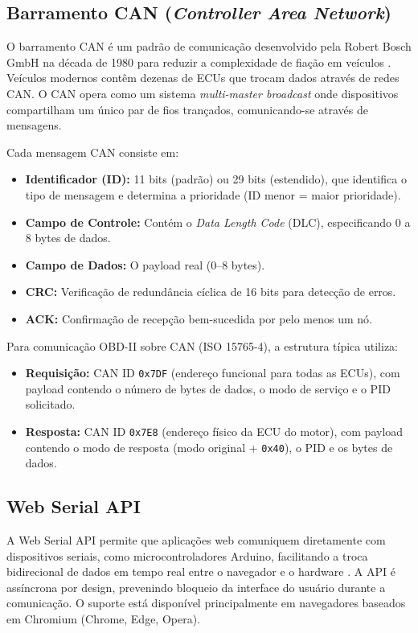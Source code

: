 \subsection{Barramento CAN (\textit{Controller Area Network})}

O barramento CAN é um padrão de comunicação desenvolvido pela Robert Bosch GmbH na década de 1980 para reduzir a complexidade de fiação em veículos \cite{bosch_can}. Veículos modernos contêm dezenas de ECUs que trocam dados através de redes CAN. O CAN opera como um sistema \textit{multi-master broadcast} onde dispositivos compartilham um único par de fios trançados, comunicando-se através de mensagens.

Cada mensagem CAN consiste em:
\begin{itemize}
    \item \textbf{Identificador (ID):} 11 bits (padrão) ou 29 bits (estendido), que identifica o tipo de mensagem e determina a prioridade (ID menor = maior prioridade).
    \item \textbf{Campo de Controle:} Contém o \textit{Data Length Code} (DLC), especificando 0 a 8 bytes de dados.
    \item \textbf{Campo de Dados:} O payload real (0--8 bytes).
    \item \textbf{CRC:} Verificação de redundância cíclica de 16 bits para detecção de erros.
    \item \textbf{ACK:} Confirmação de recepção bem-sucedida por pelo menos um nó.
\end{itemize}

Para comunicação OBD-II sobre CAN (ISO 15765-4), a estrutura típica utiliza:
\begin{itemize}
    \item \textbf{Requisição:} CAN ID \texttt{0x7DF} (endereço funcional para todas as ECUs), com payload contendo o número de bytes de dados, o modo de serviço e o PID solicitado.
    \item \textbf{Resposta:} CAN ID \texttt{0x7E8} (endereço físico da ECU do motor), com payload contendo o modo de resposta (modo original + \texttt{0x40}), o PID e os bytes de dados.
\end{itemize}

\subsection{Web Serial API}

A Web Serial API permite que aplicações web comuniquem diretamente com dispositivos seriais, como microcontroladores Arduino, facilitando a troca bidirecional de dados em tempo real entre o navegador e o hardware \cite{web_serial_api}. A API é assíncrona por design, prevenindo bloqueio da interface do usuário durante a comunicação. O suporte está disponível principalmente em navegadores baseados em Chromium (Chrome, Edge, Opera).

